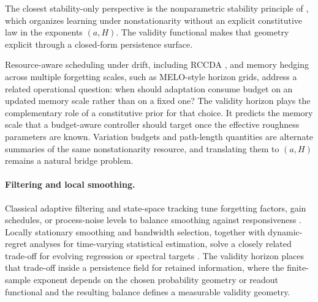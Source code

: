 The closest stability-only perspective is the nonparametric stability principle
of \citet{HuangWang2023}, which organizes learning under nonstationarity without
an explicit constitutive law in the exponents $(a,H)$. The validity
functional makes that geometry explicit through a closed-form persistence surface.

Resource-aware scheduling under drift, including RCCDA \citep{PiasecznyEtAl2025RCCDA}, and memory hedging across
multiple forgetting scales, such as MELO-style horizon grids, address a related
operational question: when should adaptation consume budget on an updated memory
scale rather than on a fixed one? The validity horizon plays the
complementary role of a constitutive prior for that choice. It predicts the
memory scale that a budget-aware controller should target once the effective
roughness parameters are known. Variation budgets and path-length quantities are
alternate summaries of the same nonstationarity resource, and translating them
to $(a,H)$ remains a natural bridge problem.

\paragraph{Filtering and local smoothing.}
Classical adaptive filtering and state-space tracking tune forgetting factors,
gain schedules, or process-noise levels to balance smoothing against
responsiveness \citep{Kalman1960,Jazwinski1970}. Locally stationary smoothing
and bandwidth selection, together with dynamic-regret analyses for time-varying
statistical estimation, solve a closely related trade-off for evolving regression
or spectral targets \citep{Dahlhaus1997,Vogt2012}. The validity horizon
places that trade-off inside a persistence field for retained information,
where the finite-sample exponent depends on the chosen probability geometry or
readout functional and the resulting balance defines a measurable validity
geometry.

